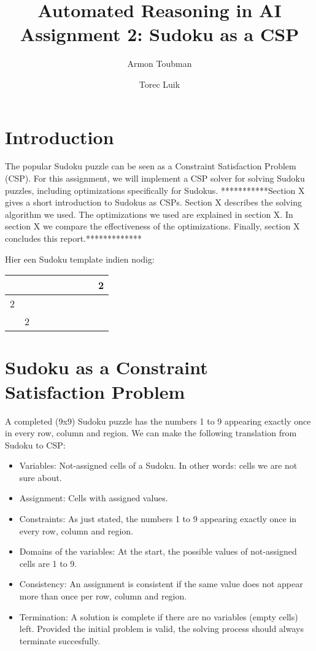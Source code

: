 \documentclass[11pt]{article} %
\title{Automated Reasoning in AI\\
Assignment 2: Sudoku as a CSP}
\author{Armon Toubman \and Torec Luik}
\begin{document}
\maketitle

\section{Introduction}

The popular Sudoku puzzle can be seen as a Constraint Satisfaction Problem (CSP). For this assignment, we will implement a CSP solver for solving Sudoku puzzles, including optimizations specifically for Sudokus. ***********Section X gives a short introduction to Sudokus as CSPs. Section X describes the solving algorithm we used. The optimizations we used are explained in section X. In section X we compare the effectiveness of the optimizations. Finally, section X concludes this report.*************%

Hier een Sudoku template indien nodig:

\begin{center}
\begin{tabular}{|c|c|c||c|c|c||c|c|c|}
\hline
 &  &  &  &  &  &  &  & 2 \\
\hline
2 &  &  &  &  &  &  &  &  \\
\hline
 & 2 &  &  &  &  &  &  &  \\
\hline
\end{tabular}
\end{center}

\section{Sudoku as a Constraint Satisfaction Problem}

A completed (9x9) Sudoku puzzle has the numbers 1 to 9 appearing exactly once in every row, column and region. We can make the following translation from Sudoku to CSP:
\begin{itemize}
\item Variables: Not-assigned cells of a Sudoku. In other words: cells we are not sure about.
\item Assignment: Cells with assigned values.
\item Constraints: As just stated,  the numbers 1 to 9 appearing exactly once in every row, column and region.
\item Domains of the variables: At the start, the possible values of not-assigned cells are 1 to 9.
\item Consistency: An assignment is consistent if the same value does not appear more than once per row, column and region.
\item Termination: A solution is complete if there are no variables (empty cells) left. Provided the initial problem is valid, the solving process should always terminate succesfully.
\end{itemize}
\end{document}
